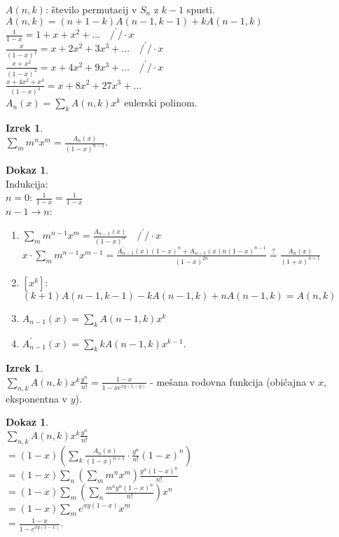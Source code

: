 \documentclass[a4paper, 12pt]{book}
\theoremstyle{definition}
\newtheorem{theorem}[counter]{Izrek}
\newtheorem{pro}[counter]{Dokaz}
\theoremstyle{remark}
\begin{document}
$A(n,k)$: število permutacij v $S_n$ z $k-1$ spusti. \\
$A(n,k) = (n+1-k) A(n-1,k-1) + k A(n-1,k)$ \\
$\frac{1}{1-x} = 1 + x + x^2 + \dots \quad /^{'} / \cdot x$ \\
$\frac{x}{(1-x)^2} = x + 2x^2 + 3x^3 + \dots \quad /^{'} / \cdot x$ \\
$\frac{x+x^2}{(1-x)^3} = x + 4x^2 + 9x^3 + \dots \quad /^{'} / \cdot x$ \\
$\frac{x+4x^2+x^3}{(1-x)^4} = x + 8x^2 + 27x^3 + \dots$ \\
$A_n(x) = \sum_k A(n,k) x^k$ eulerski polinom.
\begin{theorem} \text{} \\
  $\sum_m m^n x^m = \frac{A_n(x)}{(1-x)^{n-1}}$.
\end{theorem}
\begin{pro} \text{} \\
  Indukcija: \\
  $n=0$: $\frac{1}{1-x} = \frac{1}{1-x}$ \\
  $n-1 \to n$:
  \begin{enumerate}[label={}]
    \item $\sum_m m^{n-1} x^m = \frac{A_{n-1}(x)}{(1-x)^n} \quad /^{'} / \cdot x$ \\
      $x \cdot \sum_m m^{n-1} x^{m-1} = \frac{A_{n-1}^{'}(x)(1-x)^n + A_{n-1}(x)n(1-x)^{n-1}}{(1-x)^{2n}}
      \stackrel{?}{=} \frac{A_n(x)}{(1+x)^{n+1}}$
    \item $[x^k]$: $(k+1) A(n-1,k-1) - k A(n-1,k) + n A(n-1,k) = A(n,k)$ \checkmark
    \item $A_{n-1}(x) = \sum_k A(n-1,k) x^k$
    \item $A_{n-1}^{'}(x) = \sum_k k A(n-1,k) x^{k-1}$.
  \end{enumerate}
\end{pro}
\begin{theorem} \text{} \\
  $\sum_{n,k} A(n,k) x^k \frac{y^n}{n!} = \frac{1-x}{1-x e^{xy(1-y)}}$ -
  mešana rodovna funkcija (običajna v $x$, eksponentna v $y$).
\end{theorem}
\begin{pro} \text{} \\
  $\sum_{n,k} A(n,k) x^k \frac{y^n}{n!} $ \\
  $= (1-x) \left( \sum_k \frac{A_n(x)}{(1-x)^{n+1}} \cdot \frac{y^n}{n!} (1-x)^n\right)$ \\
  $= (1-x)\sum_n \left( \sum_m m^n x^m \right) \frac{y^n (1-x)^n}{n!}$ \\
  $= (1-x) \sum_m \left( \sum_n \frac{m^n y^n (1-x)^n}{n!} \right) x^n$ \\
  $= (1-x) \sum_m e^{xy(1-x)} x^m$ \\
  $= \frac{1-x}{1 - e^{xy(1-x)}}$.
\end{pro}
\end{document}

